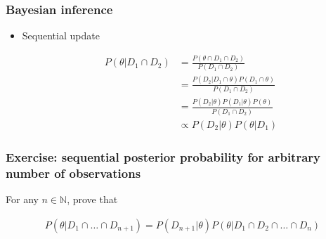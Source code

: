 \begin{frame}
    \frametitle{Bayesian inference}

    \begin{itemize}

        \item Sequential update

        \begin{align*}
            P(\theta|D_1\cap D_2)&=\frac{P(\theta\cap D_1\cap D_2)}{P(D_1\cap D_2)}\\
                                 &=\frac{P(D_2|D_1\cap\theta)P(D_1\cap\theta)}{P(D_1\cap D_2)}\\
                                 &=\frac{P(D_2|\theta)P(D_1|\theta)P(\theta)}{P(D_1\cap D_2)}\\
                                 &\propto P(D_2|\theta)P(\theta|D_1)
        \end{align*}

    \end{itemize}

\end{frame}

\begin{frame}
    \frametitle{Exercise: sequential posterior probability for arbitrary number of observations}

    For any $n\in\mathbb{N}$, prove that

    \begin{align*}
        P(\theta|D_1\cap\ldots\cap D_{n+1})=P(D_{n+1}|\theta)P(\theta|D_1\cap D_2\cap\ldots\cap D_n)
    \end{align*}

\end{frame}

